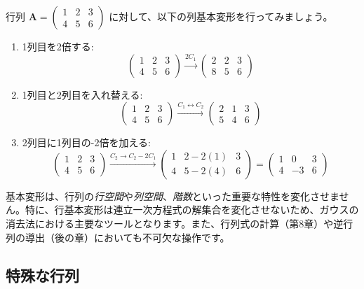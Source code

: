 \begin{ex}
行列 $\bm{A} = \begin{pmatrix} 1 & 2 & 3 \\ 4 & 5 & 6 \end{pmatrix}$ に対して、以下の列基本変形を行ってみましょう。
\begin{enumerate}
    \item 1列目を2倍する:
    \[ \begin{pmatrix} 1 & 2 & 3 \\ 4 & 5 & 6 \end{pmatrix} \xrightarrow{2C_1} \begin{pmatrix} 2 & 2 & 3 \\ 8 & 5 & 6 \end{pmatrix} \]
    \item 1列目と2列目を入れ替える:
    \[ \begin{pmatrix} 1 & 2 & 3 \\ 4 & 5 & 6 \end{pmatrix} \xrightarrow{C_1 \leftrightarrow C_2} \begin{pmatrix} 2 & 1 & 3 \\ 5 & 4 & 6 \end{pmatrix} \]
    \item 2列目に1列目の-2倍を加える:
    \[ \begin{pmatrix} 1 & 2 & 3 \\ 4 & 5 & 6 \end{pmatrix} \xrightarrow{C_2 \to C_2 - 2C_1} \begin{pmatrix} 1 & 2-2(1) & 3 \\ 4 & 5-2(4) & 6 \end{pmatrix} = \begin{pmatrix} 1 & 0 & 3 \\ 4 & -3 & 6 \end{pmatrix} \]
\end{enumerate}
\end{ex}

\begin{rmk*}
基本変形は、行列の\emph{行空間}や\emph{列空間}、\emph{階数}といった重要な特性を変化させません。特に、行基本変形は連立一次方程式の解集合を変化させないため、ガウスの消去法における主要なツールとなります。また、行列式の計算（第8章）や逆行列の導出（後の章）においても不可欠な操作です。
\end{rmk*}

\subsection{特殊な行列}

